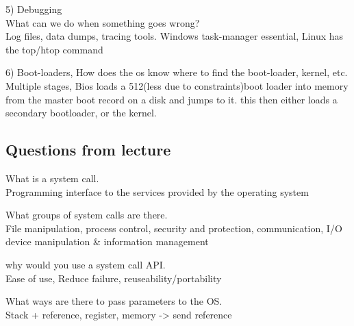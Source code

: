 \documentclass[a4paper,10pt,titlepage]{report}
\begin{document}
\vspace{5mm}


5) Debugging\\
\hspace{10mm}What can we do when something goes wrong? \\
\hspace{15mm}	Log files, data dumps, tracing tools. Windows task-manager essential, Linux has the top/htop command \\

\vspace{5mm}


6) Boot-loaders, How does the os know where to find the boot-loader, kernel, etc. \\
\hspace{10mm} Multiple stages, Bios loads a 512(less due to constraints)boot loader into memory from the master boot record on a disk and jumps to it. this then either loads a secondary bootloader, or the kernel.




\newpage
\subsection{Questions from lecture}
What is a system call.\\
\hspace{10mm} Programming interface to the services provided by the operating system \\ \vspace{5mm}


What groups of system calls are there. \\
\hspace{10mm}File manipulation, process control, security and protection, communication, I/O device manipulation \& information management\\ \vspace{5mm}


why would you use a system call API.\\
\hspace{10mm}Ease of use, Reduce failure, reuseability/portability \\ \vspace{5mm}


What ways are there to pass parameters to the OS.\\
\hspace{10mm} Stack + reference, register, memory -> send reference \\  \vspace{5mm}
\end{document}
